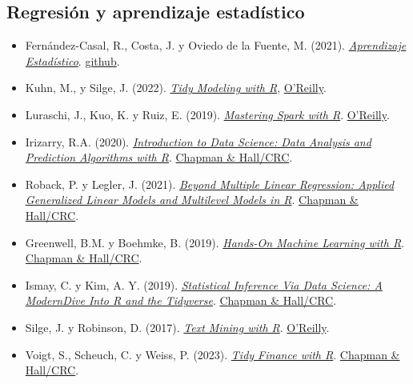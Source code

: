 \documentclass[
]{book}
\theoremstyle{break}
\theoremstyle{nonumberplain}
\begin{document}
\hypertarget{regresiuxf3n-y-aprendizaje-estaduxedstico}{%
\subsection*{Regresión y aprendizaje estadístico}\label{regresiuxf3n-y-aprendizaje-estaduxedstico}}

\begin{itemize}
\item
  Fernández-Casal, R., Costa, J. y Oviedo de la Fuente, M. (2021). \emph{\href{https://rubenfcasal.github.io/aprendizaje_estadistico}{Aprendizaje Estadístico}}. \href{https://github.com/rubenfcasal/aprendizaje_estadistico}{github}.
\item
  Kuhn, M., y Silge, J. (2022). \emph{\href{https://www.tmwr.org}{Tidy Modeling with R}}, \href{https://www.oreilly.com/library/view/tidy-modeling-with/9781492096474}{O'Reilly}.
\item
  Luraschi, J., Kuo, K. y Ruiz, E. (2019). \emph{\href{https://therinspark.com/}{Mastering Spark with R}}. \href{https://www.oreilly.com/library/view/mastering-spark-with/9781492046363/}{O'Reilly}.
\item
  Irizarry, R.A. (2020). \emph{\href{http://rafalab.dfci.harvard.edu/dsbook/}{Introduction to Data Science: Data Analysis and Prediction Algorithms with R}}. \href{https://www.routledge.com/p/book/9780367357986}{Chapman \& Hall/CRC}.
\item
  Roback, P. y Legler, J. (2021). \emph{\href{https://bookdown.org/roback/bookdown-BeyondMLR/}{Beyond Multiple Linear Regression: Applied Generalized Linear Models and Multilevel Models in R}}. \href{https://www.routledge.com/p/book/9781439885383}{Chapman \& Hall/CRC}.
\item
  Greenwell, B.M. y Boehmke, B. (2019). \emph{\href{https://bradleyboehmke.github.io/HOML/}{Hands-On Machine Learning with R}}. \href{https://www.crcpress.com/Hands-On-Machine-Learning-with-R/Boehmke-Greenwell/p/book/9781138495685}{Chapman \& Hall/CRC}.
\item
  Ismay, C. y Kim, A. Y. (2019). \emph{\href{https://moderndive.com/}{Statistical Inference Via Data Science: A ModernDive Into R and the Tidyverse}}. \href{https://www.routledge.com/p/book/9780367409821}{Chapman \& Hall/CRC}.
\item
  Silge, J. y Robinson, D. (2017). \emph{\href{https://www.tidytextmining.com/}{Text Mining with R}}. \href{https://www.oreilly.com/library/view/text-mining-with/9781491981641}{O'Reilly}.
\item
  Voigt, S., Scheuch, C. y Weiss, P. (2023). \emph{\href{https://www.tidy-finance.org/}{Tidy Finance with R}}. \href{https://www.routledge.com/p/book/9781032389349}{Chapman \& Hall/CRC}.
\end{itemize}
\end{document}
